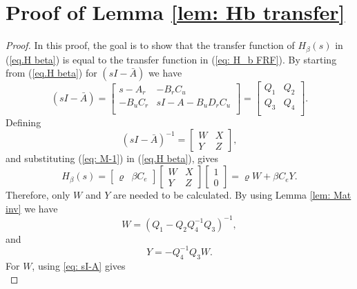 \section{Proof of Lemma \ref{lem: Hb transfer}}\label{App: I}
\begin{proof}
In this proof, the goal is to show that the transfer function of $H_\beta(s)$ in (\ref{eq.H beta}) is equal to the transfer function in (\ref{eq: H_b FRF}). By starting from (\ref{eq.H beta}) for $(sI-\bar{A})$ we have
\begin{equation}
\label{eq: sI-A}
(sI - \bar{A}) = \begin{bmatrix}
s-A_r & -B_rC_u \\
-B_uC_r & sI-A-B_uD_rC_u \\
\end{bmatrix}=\begin{bmatrix}
Q_1 & Q_2 \\
Q_3 & Q_4 \\
\end{bmatrix}.
\end{equation}
Defining
\begin{equation}
\label{eq: M-1}
(sI - \bar{A})^{-1} = \begin{bmatrix}
W & X \\
Y & Z
\end{bmatrix},
\end{equation}
and substituting (\ref{eq: M-1}) in (\ref{eq.H beta}), gives
\begin{equation}
H_\beta(s) = \begin{bmatrix}
\varrho & \beta C_e
\end{bmatrix}
\begin{bmatrix}
W & X \\
Y & Z
\end{bmatrix}
\begin{bmatrix}
1 \\
0
\end{bmatrix}
= \varrho W + \beta C_e Y.
\label{eq: Hb WY}
\end{equation}
Therefore, only $W$ and $Y$ are needed to be calculated.
By using Lemma \ref{lem: Mat inv} we have
\begin{equation}
W = \left(Q_1 - Q_2Q_4^{-1}Q_3\right)^{-1},
\label{eq: W}
\end{equation}
and
\begin{equation}
Y = -Q_4^{-1}Q_3W.
\label{eq: WY}
\end{equation}
For $W$, using \eqref{eq: sI-A} gives
\begin{equation}

\end{equation}
\end{proof}
